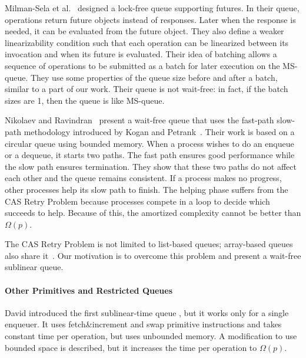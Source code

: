 Milman-Sela et al.~\cite{MKLLP22} designed a lock-free
queue supporting futures. In their queue, operations  return future
objects instead of responses. Later when the response is needed, it
can be evaluated from the future object. They also define a weaker
linearizability condition such that each operation can be linearized
between its invocation and when its future is evaluated. Their idea of
batching allows a sequence of operations to be submitted as a batch
for later execution on the MS-queue. They use some properties of the
queue size before and after a batch, similar to a part of our
work. Their queue is not wait-free: in fact, if the batch sizes are 1,
then the queue is like MS-queue. 

Nikolaev and Ravindran~\cite{10.1145/3490148.3538572} present a
wait-free queue that uses the fast-path slow-path methodology
introduced by Kogan and Petrank~\cite{10.1145/2370036.2145835}. Their
work is based on a circular queue using bounded memory. When a process
wishes to do an enqueue or a dequeue, it starts two paths. The fast
path  ensures good performance while the slow path ensures
termination. They show that these two paths do not affect each other
and the queue remains consistent. If a process makes no progress,
other processes help its slow path to finish. The helping phase
suffers from the CAS Retry Problem because processes compete in a
 loop to decide which succeeds to help. Because of this, the
amortized complexity cannot be better than $\Omega(p)$. 

The CAS Retry Problem is not limited to list-based queues; array-based
queues also share
it~\cite{DBLP:conf/iceccs/ColvinG05,DBLP:conf/icdcn/Shafiei09,DBLP:conf/spaa/TsigasZ01}.
Our motivation is to overcome this problem and present a wait-free
sublinear queue. 


\paragraph{Other Primitives and Restricted Queues}

David introduced the first sublinear-time queue
\cite{DBLP:conf/wdag/David04}, but it works only for a single enqueuer.
It uses fetch\&increment and swap primitive instructions and takes constant time per operation, but
uses unbounded memory.  A modification to use bounded space
is described, but it increases the time per operation to $\Omega(p)$.


